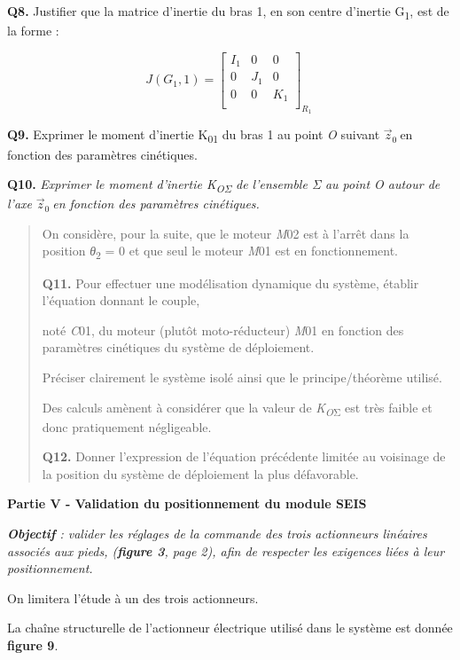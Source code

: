 \documentclass[]{article}
\begin{document}
\textbf{Q8.} Justifier que la matrice d'inertie du bras 1, en son centre
d'inertie G\textsubscript{1}, est de la forme :

\[J(G_{1},1) = \begin{bmatrix}
I_{1} & 0 & 0 \\
0 & J_{1} & 0 \\
0 & 0 & K_{1} \\
\end{bmatrix}_{R_{1}}\ \]

\textbf{Q9.} Exprimer le moment d'inertie K\textsubscript{01} du bras 1
au point \emph{O} suivant \({\overrightarrow{z}}_{0}\ \)en fonction des
paramètres cinétiques.

\textbf{Q10.} \emph{Exprimer le moment d'inertie K\textsubscript{OΣ} de
l'ensemble Σ au point O autour de l'axe}
\({\overrightarrow{z}}_{0}\ \)\emph{en fonction des paramètres
cinétiques.}

\begin{quote}
On considère, pour la suite, que le moteur \emph{M}02 est à l'arrêt dans
la position \emph{θ}\textsubscript{2} = 0 et que seul le moteur
\emph{M}01 est en fonctionnement.

\textbf{Q11.} Pour effectuer une modélisation dynamique du système,
établir l'équation donnant le couple,

noté \emph{C}01, du moteur (plutôt moto-réducteur) \emph{M}01 en
fonction des paramètres cinétiques du système de déploiement.

Préciser clairement le système isolé ainsi que le principe/théorème
utilisé.

Des calculs amènent à considérer que la valeur de
\emph{K\textsubscript{O}}\textsubscript{Σ} est très faible et donc
pratiquement négligeable.

\textbf{Q12.} Donner l'expression de l'équation précédente limitée au
voisinage de la position du système de déploiement la plus défavorable.
\end{quote}

\protect\hypertarget{page8}{}{}\textbf{Partie V - Validation du
positionnement du module SEIS}

\emph{\textbf{Objectif} : valider les réglages de la commande des trois
actionneurs linéaires associés aux pieds, (\textbf{figure 3}, page 2),
afin de respecter les exigences liées à leur positionnement.}

On limitera l'étude à un des trois actionneurs.

La chaîne structurelle de l'actionneur électrique utilisé dans le
système est donnée \textbf{figure 9}.
\end{document}

